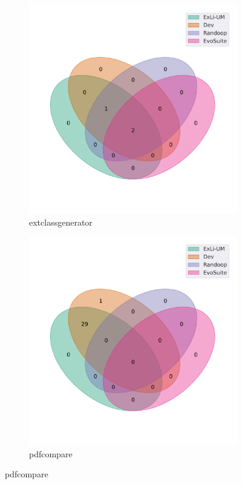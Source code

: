 \begin{figure}[t]\ContinuedFloat
\begin{subfigure}[b]{0.45\textwidth}
\includegraphics[width=\textwidth]{figures/venn/ralscha_extclassgenerator-venn.pdf}
\vspace{-10pt}
\caption{extclassgenerator}
\label{fig:venn-ralscha_extclassgenerator}
\end{subfigure}
\hfill
\begin{subfigure}[b]{0.45\textwidth}
\includegraphics[width=\textwidth]{figures/venn/red6_pdfcompare-venn.pdf}
\vspace{-10pt}
\caption{pdfcompare}
\label{fig:venn-red6_pdfcompare}
\end{subfigure}
\end{figure}
